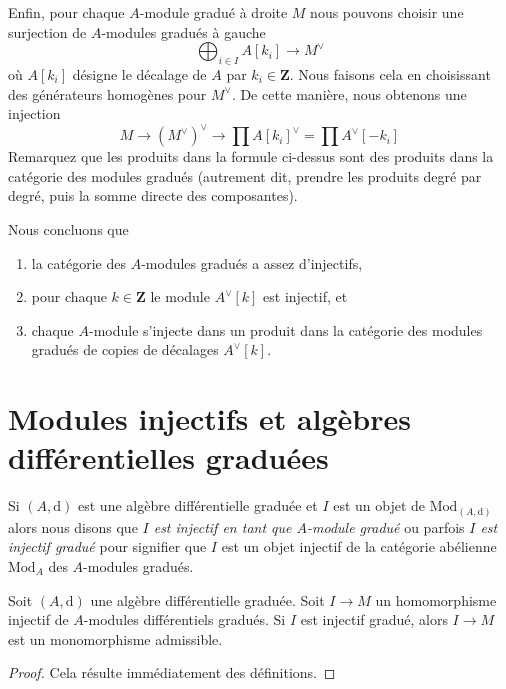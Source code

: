 \medskip\noindent
Enfin, pour chaque $A$-module gradué à droite $M$ nous pouvons choisir une
surjection de $A$-modules gradués à gauche
$$
\bigoplus\nolimits_{i \in I} A[k_i] \to M^\vee
$$
où $A[k_i]$ désigne le décalage de $A$ par $k_i \in \mathbf{Z}$. Nous faisons cela
en choisissant des générateurs homogènes pour $M^\vee$. De cette manière, nous
obtenons une injection
$$
M \to (M^\vee)^\vee \to \prod A[k_i]^\vee = \prod A^\vee[-k_i]
$$
Remarquez que les produits dans la formule ci-dessus sont des produits dans la
catégorie des modules gradués (autrement dit, prendre les produits degré par degré,
puis la somme directe des composantes).

\medskip\noindent
Nous concluons que
\begin{enumerate}
\item la catégorie des $A$-modules gradués a assez d'injectifs,
\item pour chaque $k \in \mathbf{Z}$ le module $A^\vee[k]$ est injectif, et
\item chaque $A$-module s'injecte dans un produit dans la catégorie des modules
gradués de copies de décalages $A^\vee[k]$.
\end{enumerate}





\section{Modules injectifs et algèbres différentielles graduées}
\label{section-modules-noncommutative-differential-graded}

\noindent
Si $(A, \text{d})$ est une algèbre différentielle graduée et $I$ est un objet de
$\text{Mod}_{(A, \text{d})}$ alors nous disons que {\it $I$ est injectif en tant
que $A$-module gradué} ou parfois {\it $I$ est injectif gradué} pour signifier que
$I$ est un objet injectif de la catégorie abélienne $\text{Mod}_A$ des $A$-modules
gradués.

\begin{lemma}
\label{lemma-source-graded-injective}
Soit $(A, \text{d})$ une algèbre différentielle graduée. Soit $I \to M$ un
homomorphisme injectif de $A$-modules différentiels gradués. Si $I$ est injectif
gradué, alors $I \to M$ est un monomorphisme admissible.
\end{lemma}

\begin{proof}
Cela résulte immédiatement des définitions.
\end{proof}

